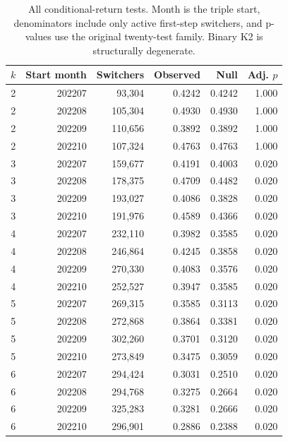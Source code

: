 \documentclass[journal,letterpaper]{IEEEtran}
\begin{document}
\begin{table}[t]
\centering\footnotesize
\caption{All conditional-return tests. Month is the triple start, denominators include only active first-step switchers, and p-values use the original twenty-test family. Binary K2 is structurally degenerate.}
\label{tab:suppreturntests}
\begin{tabular}{rrrrrr}
\toprule
$k$ & Start month & Switchers & Observed & Null & Adj. $p$ \\
\midrule
2 & 202207 & 93,304 & 0.4242 & 0.4242 & 1.000 \\
2 & 202208 & 105,304 & 0.4930 & 0.4930 & 1.000 \\
2 & 202209 & 110,656 & 0.3892 & 0.3892 & 1.000 \\
2 & 202210 & 107,324 & 0.4763 & 0.4763 & 1.000 \\
3 & 202207 & 159,677 & 0.4191 & 0.4003 & 0.020 \\
3 & 202208 & 178,375 & 0.4709 & 0.4482 & 0.020 \\
3 & 202209 & 193,027 & 0.4086 & 0.3828 & 0.020 \\
3 & 202210 & 191,976 & 0.4589 & 0.4366 & 0.020 \\
4 & 202207 & 232,110 & 0.3982 & 0.3585 & 0.020 \\
4 & 202208 & 246,864 & 0.4245 & 0.3858 & 0.020 \\
4 & 202209 & 270,330 & 0.4083 & 0.3576 & 0.020 \\
4 & 202210 & 252,527 & 0.3947 & 0.3585 & 0.020 \\
5 & 202207 & 269,315 & 0.3585 & 0.3113 & 0.020 \\
5 & 202208 & 272,868 & 0.3864 & 0.3381 & 0.020 \\
5 & 202209 & 302,260 & 0.3701 & 0.3120 & 0.020 \\
5 & 202210 & 273,849 & 0.3475 & 0.3059 & 0.020 \\
6 & 202207 & 294,424 & 0.3031 & 0.2510 & 0.020 \\
6 & 202208 & 294,768 & 0.3275 & 0.2664 & 0.020 \\
6 & 202209 & 325,283 & 0.3281 & 0.2666 & 0.020 \\
6 & 202210 & 296,901 & 0.2886 & 0.2388 & 0.020 \\
\bottomrule
\end{tabular}
\end{table}
\end{document}
